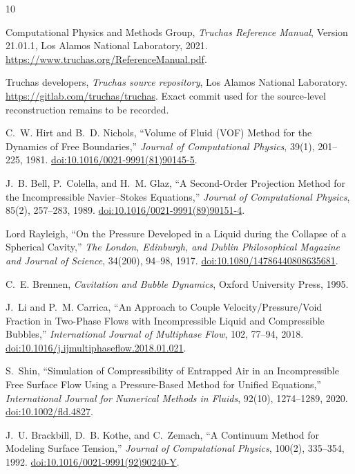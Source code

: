 \documentclass[11pt]{article}
\newcommand{\doi}[1]{\href{https://doi.org/#1}{doi:#1}}
\begin{document}
\begin{thebibliography}{10}

Computational Physics and Methods Group,
\emph{Truchas Reference Manual}, Version 21.01.1,
Los Alamos National Laboratory, 2021.
\url{https://www.truchas.org/ReferenceManual.pdf}.

Truchas developers,
\emph{Truchas source repository}, Los Alamos National Laboratory.
\url{https://gitlab.com/truchas/truchas}.
Exact commit used for the source-level reconstruction remains to be recorded.

C.~W. Hirt and B.~D. Nichols,
``Volume of Fluid (VOF) Method for the Dynamics of Free Boundaries,''
\emph{Journal of Computational Physics}, 39(1), 201--225, 1981.
\doi{10.1016/0021-9991(81)90145-5}.

J.~B. Bell, P.~Colella, and H.~M. Glaz,
``A Second-Order Projection Method for the Incompressible Navier--Stokes Equations,''
\emph{Journal of Computational Physics}, 85(2), 257--283, 1989.
\doi{10.1016/0021-9991(89)90151-4}.

Lord Rayleigh,
``On the Pressure Developed in a Liquid during the Collapse of a Spherical Cavity,''
\emph{The London, Edinburgh, and Dublin Philosophical Magazine and Journal of Science},
34(200), 94--98, 1917.
\doi{10.1080/14786440808635681}.

C.~E. Brennen,
\emph{Cavitation and Bubble Dynamics}, Oxford University Press, 1995.

J.~Li and P.~M. Carrica,
``An Approach to Couple Velocity/Pressure/Void Fraction in Two-Phase Flows with
Incompressible Liquid and Compressible Bubbles,''
\emph{International Journal of Multiphase Flow}, 102, 77--94, 2018.
\doi{10.1016/j.ijmultiphaseflow.2018.01.021}.

S.~Shin,
``Simulation of Compressibility of Entrapped Air in an Incompressible Free Surface Flow
Using a Pressure-Based Method for Unified Equations,''
\emph{International Journal for Numerical Methods in Fluids}, 92(10), 1274--1289, 2020.
\doi{10.1002/fld.4827}.

J.~U. Brackbill, D.~B. Kothe, and C.~Zemach,
``A Continuum Method for Modeling Surface Tension,''
\emph{Journal of Computational Physics}, 100(2), 335--354, 1992.
\doi{10.1016/0021-9991(92)90240-Y}.

\end{thebibliography}
\end{document}
